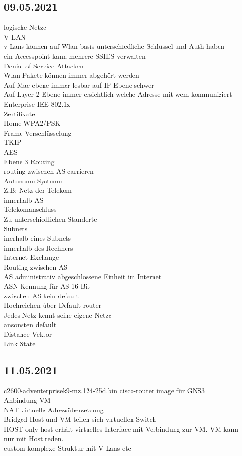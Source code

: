 \documentclass{article}
\begin{document}
	\subsection*{09.05.2021}
	logische Netze \\
	V-LAN \\
	v-Lans können auf Wlan basis unterschiedliche Schlüssel und Auth haben \\
	ein Accesspoint kann mehrere SSIDS verwalten \\
	Denial of Service Attacken \\
	Wlan Pakete können immer abgehört werden \\
	Auf Mac ebene immer lesbar auf IP Ebene schwer \\
	Auf Layer 2 Ebene immer ersichtlich welche Adresse mit wem kommuniziert \\
	Enterprise 
	IEE 802.1x \\
	Zertifikate \\
	Home
	WPA2/PSK \\
	Frame-Verschlüsselung \\
	TKIP \\
	AES  \\
	Ebene 3 Routing \\
	routing zwischen AS carrieren \\
	Autonome Systeme \\
	Z.B: Netz der Telekom \\
	innerhalb AS \\
	Telekomanschluss \\
	Zu unterschiedlichen Standorte \\
	Subnets \\
	inerhalb eines Subnets \\
	innerhalb des Rechners \\
	Internet Exchange \\
	Routing zwischen AS \\
	AS administrativ abgeschlossene Einheit im Internet \\
	ASN Kennung für AS 16 Bit \\
	zwischen AS kein default \\
	Hochreichen über Default router \\
	Jedes Netz kennt seine eigene Netze \\
	ansonsten default \\
	Distance Vektor \\
	Link State \\
	\subsection*{11.05.2021}
	c2600-adventerprisek9-mz.124-25d.bin
	cisco-router image für GNS3 \\
	Anbindung VM \\
	NAT virtuelle Adressübersetzung \\
	Bridged Host und VM teilen sich virtuellen Switch \\
	HOST only host erhält virtuelles Interface mit Verbindung zur VM. VM kann nur mit Host reden. \\
	custom komplexe Struktur mit V-Lans etc \\
\end{document}
